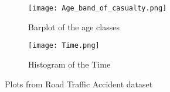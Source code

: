\documentclass{article}
\begin{document}
\begin{figure}[H]
    \centering
    \begin{subfigure}[b]{0.45\textwidth}
        \centering
        \texttt{[image: Age\_band\_of\_casualty.png]}
        \caption{ Barplot of the age classes}
        \label{fig:bar:casuality}
    \end{subfigure}
    \hspace{0.05\textwidth}
    \begin{subfigure}[b]{0.45\textwidth}
        \centering
        \texttt{[image: Time.png]}
        \caption{ Histogram of the Time}
        \label{fig:bar:time}
    \end{subfigure}
    \caption{Plots from Road Traffic Accident dataset}
    \label{fig:Accident}
\end{figure}
\end{document}
